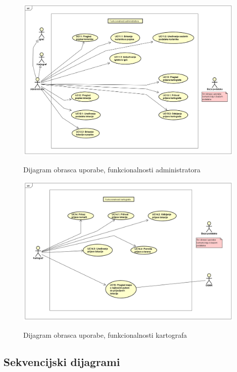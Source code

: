 			\begin{figure}[H]
				\centering
				\includegraphics[scale=0.42]{dijagrami/funkcionalnosti_administratora} \\
				\caption{Dijagram obrasca uporabe, funkcionalnosti administratora}
				\label{fig:funkcionalnosti_administratora} 
			\end{figure}
		
		\begin{figure}[H]
			\centering
			\includegraphics[scale=0.42]{dijagrami/funkcionalnosti_kartografa} \\
			\caption{Dijagram obrasca uporabe, funkcionalnosti kartografa}
			\label{fig:funkcionalnosti_kartografa} 
		\end{figure}
			\subsection{Sekvencijski dijagrami}
				
